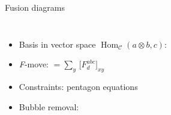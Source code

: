 \documentclass{fdubeamer}
\newcommand{\tikzinput}[1]{}
\newcommand{\1}{\mathbb{1}}
\begin{document}
\begin{frame}{Fusion diagrams}

\linespread{1.4}
\selectfont

\begin{columns}[c]


    \begin{itemize}
      \item Basis in vector space $\operatorname{Hom}_{\mathcal{C}}(a\otimes b,c)$:
            {\small \tikzinput{category/fusion-tree-1}}
      \item \textit{F}-move:
            {\small $\tikzinput{category/f-symbol-1} = \sum_y \, \bigl[ F^{abc}_d \bigr]_{xy} \tikzinput{category/f-symbol-2}$}
      \item Constraints: pentagon equations
      \item Bubble removal:
            \mbox{\qquad}{\small $\tikzinput{category/loop-removal}$}
    \end{itemize}


    \centering
    {\small \tikzinput{category/f-symbols-pentagon-equation-narrow}}

\end{columns}

\end{frame}
\end{document}
